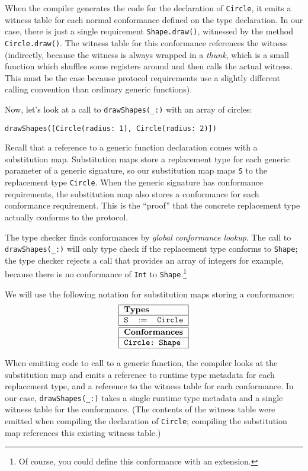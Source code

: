 \documentclass[a4paper,headsepline,bibliography=totoc,toc=flat,fleqn,twoside=semi]{scrbook}
\theoremstyle{definition}
\theoremstyle{definition}
\theoremstyle{definition}
\newcommand{\SubMapC}[2]{\begin{tabular}{|lll|}
\hline
\multicolumn{3}{|l|}{\textbf{Types}}\\
\hline
#1\\
\hline
\hline
\multicolumn{3}{|l|}{\textbf{Conformances}}\\
\hline
#2\\
\hline
\end{tabular}}
\newcommand{\SubType}[2]{\texttt{#1}&$:=$&\texttt{#2}}
\newcommand{\SubConf}[1]{\multicolumn{3}{|l|}{\texttt{#1}}}
\begin{document}
When the compiler generates the code for the declaration of \texttt{Circle}, it emits a witness table for each normal conformance defined on the type declaration. In our case, there is just a single requirement \texttt{Shape.draw()}, witnessed by the method \texttt{Circle.draw()}. The witness table for this conformance references the witness (indirectly, because the witness is always wrapped in a \emph{thunk}, which is a small function which shuffles some registers around and then calls the actual witness. This must be the case because protocol requirements use a slightly different calling convention than ordinary generic functions).

Now, let's look at a call to \verb|drawShapes(_:)| with an array of circles:
\begin{Verbatim}
drawShapes([Circle(radius: 1), Circle(radius: 2)])
\end{Verbatim}
Recall that a reference to a generic function declaration comes with a substitution map. Substitution maps store a replacement type for each generic parameter of a generic signature, so our substitution map maps \texttt{S} to the replacement type \texttt{Circle}. When the generic signature has conformance requirements, the substitution map also stores a conformance for each conformance requirement. This is the ``proof'' that the concrete replacement type actually conforms to the protocol.

The type checker finds conformances by \emph{global conformance lookup}. The call to \verb|drawShapes(_:)| will only type check if the replacement type conforms to \texttt{Shape}; the type checker rejects a call that provides an array of integers for example, because there is no conformance of \texttt{Int} to \texttt{Shape}.\footnote{Of course, you could define this conformance with an extension.}

We will use the following notation for substitution maps storing a conformance:
\[\SubMapC{\SubType{S}{Circle}}{\SubConf{Circle:\ Shape}}\]

When emitting code to call to a generic function, the compiler looks at the substitution map and emits a reference to runtime type metadata for each replacement type, and a reference to the witness table for each conformance. In our case, \verb|drawShapes(_:)| takes a single runtime type metadata and a single witness table for the conformance. (The contents of the witness table were emitted when compiling the declaration of \texttt{Circle}; compiling the substitution map references this existing witness table.)
\end{document}
